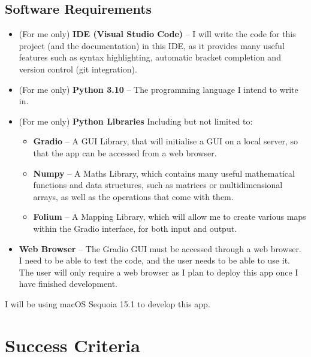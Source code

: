 \documentclass[12pt]{report}
\begin{document}
\subsection{Software Requirements}
\begin{itemize}
    \item (For me only) \textbf{IDE (Visual Studio Code)} -- I will write the code for this project (and the documentation) in this IDE, as it provides many useful features such as syntax highlighting, automatic bracket completion and version control (git integration).
    \item (For me only) \textbf{Python 3.10} -- The programming language I intend to write in.
    \item (For me only) \textbf{Python Libraries} Including but not limited to:
    \begin{itemize}
        \item \textbf{Gradio} -- A GUI Library, that will initialise a GUI on a local server, so that the app can be accessed from a web browser.
        \item \textbf{Numpy} -- A Maths Library, which contains many useful mathematical functions and data structures, such as matrices or multidimensional arrays, as well as the operations that come with them.
        \item \textbf{Folium} -- A Mapping Library, which will allow me to create various maps within the Gradio interface, for both input and output.
    \end{itemize}
    \item \textbf{Web Browser} -- The Gradio GUI must be accessed through a web browser. I need to be able to test the code, and the user needs to be able to use it. The user will only require a web browser as I plan to deploy this app once I have finished development.
\end{itemize}
I will be using macOS Sequoia 15.1 to develop this app.

\section{Success Criteria}
\begin{center}
\end{center}
\end{document}
